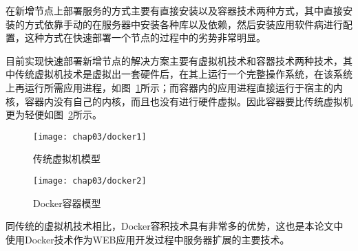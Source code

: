 在新增节点上部署服务的方式主要有直接安装以及容器技术两种方式，其中直接安装的方式依靠手动的在服务器中安装各种库以及依赖，然后安装应用软件病进行配置，这种方式在快速部署一个节点的过程中的劣势非常明显。

目前实现快速部署新增节点的解决方案主要有虚拟机技术和容器技术两种技术，其中传统虚拟机技术是虚拟出一套硬件后，在其上运行一个完整操作系统，在该系统上再运行所需应用进程，如图~\ref{fig:docker1}所示；而容器内的应用进程直接运行于宿主的内核，容器内没有自己的内核，而且也没有进行硬件虚拟。因此容器要比传统虚拟机更为轻便如图~\ref{fig:docker2}所示\cite{刘熙2016基于}。

\begin{figure}[H] %
  \centering
  \texttt{[image: chap03/docker1]}
  \caption{传统虚拟机模型}
  \label{fig:docker1}
\end{figure}
\begin{figure}[H] %
  \centering
  \texttt{[image: chap03/docker2]}
  \caption{Docker容器模型}
  \label{fig:docker2}
\end{figure}
同传统的虚拟机技术相比，Docker容积技术具有非常多的优势，这也是本论文中使用Docker技术作为WEB应用开发过程中服务器扩展的主要技术\cite{chamberlain2014using}。
